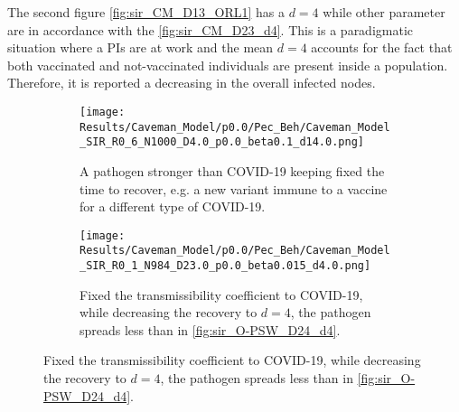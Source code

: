 \documentclass[a4paper,10pt,twoside]{book} %
\theoremstyle{definition}
\begin{document}
The second figure \autoref{fig:sir_CM_D13_ORL1} has a $d = 4$ while other parameter are in accordance with the \autoref{fig:sir_CM_D23_d4}. This is a paradigmatic situation where a PIs are at work and the mean $ d = 4$ accounts for the fact that both vaccinated and not-vaccinated individuals are present inside a population. Therefore, it is reported a decreasing in the overall infected nodes. 

\begin{figure}[H]
	\centering
	\begin{subfigure}{0.93\linewidth}
		\texttt{[image: Results/Caveman\_Model/p0.0/Pec\_Beh/Caveman\_Model\_SIR\_R0\_6\_N1000\_D4.0\_p0.0\_beta0.1\_d14.0.png]}
		\caption{A pathogen stronger than COVID-19 keeping fixed the time to recover, e.g. a new variant immune to a vaccine for a different type of COVID-19.}
		\label{fig:sir_CM_D4_OR1_d14_b0.1}
	\end{subfigure}
	\par\bigskip
	\centering
	\begin{subfigure}{0.93\linewidth}
		\texttt{[image: Results/Caveman\_Model/p0.0/Pec\_Beh/Caveman\_Model\_SIR\_R0\_1\_N984\_D23.0\_p0.0\_beta0.015\_d4.0.png]}
		\caption{Fixed the transmissibility coefficient to COVID-19, while decreasing the recovery to $d = 4$, the pathogen spreads less than in \autoref{fig:sir_O-PSW_D24_d4}.}
		\label{fig:sir_CM_D23_d4}
	\end{subfigure}
\end{figure}

\clearpage
{}
\end{document}
